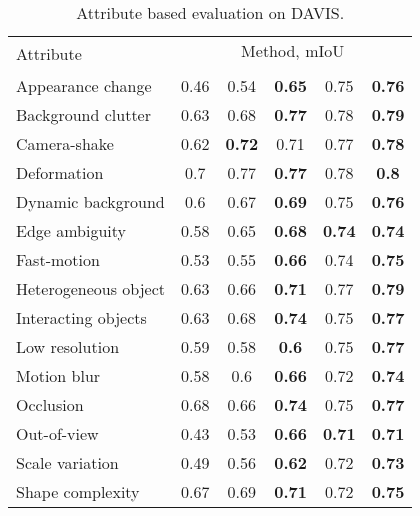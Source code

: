 \documentclass[10pt,twocolumn,letterpaper]{article}
\begin{document}
\begin{table*}
\begin{centering}
\begingroup
\begin{tabular}{l|ccc||cc}
\multirow{2}{*}{Attribute} & \multicolumn{5}{c}{Method, mIoU}\\
&  \cite{Maerki2016Cvpr} &  \cite{Tsai2016Cvpr}&  &  & \tabularnewline
\hline
\hline
Appearance change & 0.46& 0.54& \textbf{0.65} & 0.75& \textbf{0.76}\tabularnewline
Background clutter& 0.63 & 0.68 & \textbf{0.77} & 0.78 & \textbf{0.79}\tabularnewline
Camera-shake& 0.62 & \textbf{0.72} & 0.71 & 0.77 & \textbf{0.78}\tabularnewline
Deformation& 0.7& 0.77& \textbf{0.77} &0.78 & \textbf{0.8}\tabularnewline
Dynamic background& 0.6 & 0.67 & \textbf{0.69}& 0.75 & \textbf{0.76}\tabularnewline
Edge ambiguity& 0.58 & 0.65& \textbf{0.68} & \textbf{0.74} & \textbf{0.74}\tabularnewline
Fast-motion & 0.53 & 0.55& \textbf{0.66} & 0.74 & \textbf{0.75}\tabularnewline
Heterogeneous object& 0.63 & 0.66 & \textbf{0.71} & 0.77 &\textbf{0.79}\tabularnewline
Interacting objects& 0.63 & 0.68 & \textbf{0.74} & 0.75 &\textbf{0.77}\tabularnewline
Low resolution& 0.59& 0.58& \textbf{0.6} & 0.75 & \textbf{0.77}\tabularnewline
Motion blur& 0.58& 0.6& \textbf{0.66}& 0.72 & \textbf{0.74}\tabularnewline
Occlusion& 0.68 & 0.66 & \textbf{0.74} & 0.75 & \textbf{0.77}\tabularnewline
Out-of-view& 0.43 & 0.53 & \textbf{0.66} & \textbf{0.71} & \textbf{0.71}\tabularnewline
Scale variation& 0.49 & 0.56 & \textbf{0.62}& 0.72 & \textbf{0.73}\tabularnewline
Shape complexity& 0.67 & 0.69 & \textbf{0.71} & 0.72 & \textbf{0.75}\tabularnewline
\end{tabular}\endgroup
\par\end{centering}
\caption{\label{tab:attr-eval}Attribute based evaluation on DAVIS.}
\end{table*}
\end{document}
